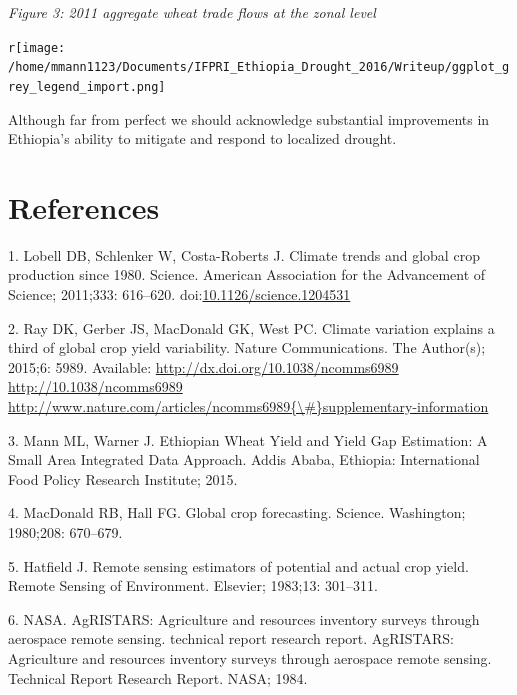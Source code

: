 \documentclass[]{elsarticle} %
\begin{document}
\emph{Figure 3: 2011 aggregate wheat trade flows at the zonal level}

\texttt{r}\texttt{[image: /home/mmann1123/Documents/IFPRI\_Ethiopia\_Drought\_2016/Writeup/ggplot\_grey\_legend\_import.png]}

Although far from perfect we should acknowledge substantial improvements
in Ethiopia's ability to mitigate and respond to localized drought.

\section*{References}\label{references}

\hypertarget{refs}{}
\hypertarget{ref-Lobell616}{}
1. Lobell DB, Schlenker W, Costa-Roberts J. Climate trends and global
crop production since 1980. Science. American Association for the
Advancement of Science; 2011;333: 616--620.
doi:\href{https://doi.org/10.1126/science.1204531}{10.1126/science.1204531}

\hypertarget{ref-Ray2015}{}
2. Ray DK, Gerber JS, MacDonald GK, West PC. Climate variation explains
a third of global crop yield variability. Nature Communications. The
Author(s); 2015;6: 5989. Available:
\href{http://dx.doi.org/10.1038/ncomms6989\%20http://10.1038/ncomms6989\%20http://www.nature.com/articles/ncomms6989\%7B/\#\%7Dsupplementary-information}{http://dx.doi.org/10.1038/ncomms6989 http://10.1038/ncomms6989 http://www.nature.com/articles/ncomms6989\{\textbackslash{}\#\}supplementary-information}

\hypertarget{ref-Mann2015}{}
3. Mann ML, Warner J. Ethiopian Wheat Yield and Yield Gap Estimation: A
Small Area Integrated Data Approach. Addis Ababa, Ethiopia:
International Food Policy Research Institute; 2015.

\hypertarget{ref-macdonald1980global}{}
4. MacDonald RB, Hall FG. Global crop forecasting. Science. Washington;
1980;208: 670--679.

\hypertarget{ref-hatfield1983remote}{}
5. Hatfield J. Remote sensing estimators of potential and actual crop
yield. Remote Sensing of Environment. Elsevier; 1983;13: 301--311.

\hypertarget{ref-NASA1984}{}
6. NASA. AgRISTARS: Agriculture and resources inventory surveys through
aerospace remote sensing. technical report research report. AgRISTARS:
Agriculture and resources inventory surveys through aerospace remote
sensing. Technical Report Research Report. NASA; 1984.
\end{document}
